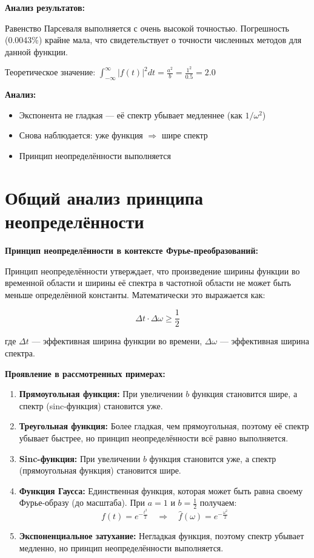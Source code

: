 \textbf{Анализ результатов:}

Равенство Парсеваля выполняется с очень высокой точностью. Погрешность (0.0043\%) крайне мала, что свидетельствует о точности численных методов для данной функции.

Теоретическое значение: $\displaystyle \int_{-\infty}^{\infty} |f(t)|^2 dt = \frac{a^2}{b} = \frac{1^2}{0.5} = 2.0$

\textbf{Анализ:}

\begin{itemize}
    \item Экспонента не гладкая — её спектр убывает медленнее (как $1/\omega^2$)
    \item Снова наблюдается: уже функция $\Rightarrow$ шире спектр
    \item Принцип неопределённости выполняется
\end{itemize}

\section*{Общий анализ принципа неопределённости}

\textbf{Принцип неопределённости в контексте Фурье-преобразований:}

Принцип неопределённости утверждает, что произведение ширины функции во временной области и ширины её спектра в частотной области не может быть меньше определённой константы. Математически это выражается как:

\[
\Delta t \cdot \Delta \omega \geq \frac{1}{2}
\]

где $\Delta t$ — эффективная ширина функции во времени, $\Delta \omega$ — эффективная ширина спектра.

\textbf{Проявление в рассмотренных примерах:}

\begin{enumerate}
    \item \textbf{Прямоугольная функция:} При увеличении $b$ функция становится шире, а спектр (sinc-функция) становится уже.
    
    \item \textbf{Треугольная функция:} Более гладкая, чем прямоугольная, поэтому её спектр убывает быстрее, но принцип неопределённости всё равно выполняется.
    
    \item \textbf{Sinc-функция:} При увеличении $b$ функция становится уже, а спектр (прямоугольная функция) становится шире.
    
    \item \textbf{Функция Гаусса:} Единственная функция, которая может быть равна своему Фурье-образу (до масштаба). При $a = 1$ и $b = \frac{1}{2}$ получаем:
    \[
    f(t) = e^{-\frac{t^2}{2}} \quad \Rightarrow \quad \hat{f}(\omega) = e^{-\frac{\omega^2}{2}}
    \]
    
    \item \textbf{Экспоненциальное затухание:} Негладкая функция, поэтому спектр убывает медленно, но принцип неопределённости выполняется.
\end{enumerate}

